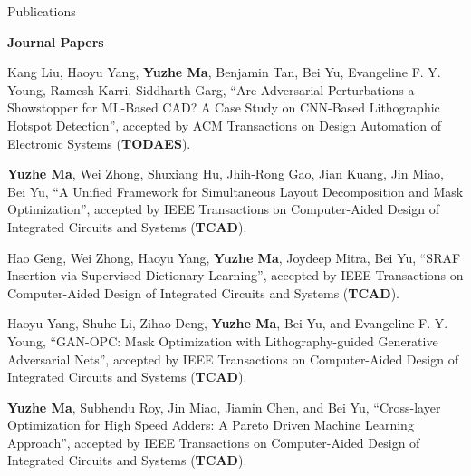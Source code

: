 \begin{rSection}{Publications}

\iffalse
\textbf{Books / Book Chapters}
\begin{description}[font=\normalfont]

\end{description}
\fi

\textbf{Journal Papers}
\begin{description}[font=\normalfont]
\iffalse
\item \textbf{Submitted}

\fi


\item[{[J8]}]{
        Kang Liu, Haoyu Yang, \textbf{Yuzhe Ma}, Benjamin Tan, Bei Yu, Evangeline F. Y. Young, Ramesh Karri, Siddharth Garg,
        ``Are Adversarial Perturbations a Showstopper for ML-Based CAD? A Case Study on CNN-Based Lithographic Hotspot Detection'',
        accepted by ACM Transactions on Design Automation of Electronic Systems (\textbf{TODAES}).
}


\item[{[J7]}]{
        \textbf{Yuzhe Ma}, Wei Zhong, Shuxiang Hu, Jhih-Rong Gao, Jian Kuang, Jin Miao, Bei Yu, 
        ``A Unified Framework for Simultaneous Layout Decomposition and Mask Optimization'', 
        accepted by IEEE Transactions on Computer-Aided Design of Integrated Circuits and Systems (\textbf{TCAD}).
}

\item[{[J6]}]{
    Hao Geng, Wei Zhong, Haoyu Yang, \textbf{Yuzhe Ma}, Joydeep Mitra, Bei Yu, 
        ``SRAF Insertion via Supervised Dictionary Learning'', 
        accepted by IEEE Transactions on Computer-Aided Design of Integrated Circuits and Systems (\textbf{TCAD}).
}

\item[{[J5]}]{
    Haoyu Yang, Shuhe Li, Zihao Deng, \textbf{Yuzhe Ma}, Bei Yu, and Evangeline F. Y. Young, 
    ``GAN-OPC: Mask Optimization with Lithography-guided Generative Adversarial Nets'',
    accepted by IEEE Transactions on Computer-Aided Design of Integrated Circuits and Systems (\textbf{TCAD}).
}

\item[{[J4]}]{
	\textbf{Yuzhe Ma}, Subhendu Roy, Jin Miao, Jiamin Chen, and Bei Yu,
	``Cross-layer Optimization for High Speed Adders: A Pareto Driven Machine Learning Approach'', 
	accepted by IEEE Transactions on Computer-Aided Design of Integrated Circuits and Systems (\textbf{TCAD}).
}


\end{description}
\end{rSection}
